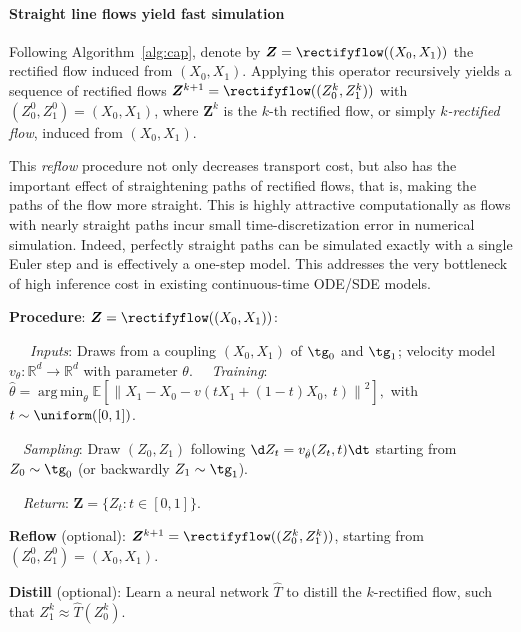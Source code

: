 \documentclass[11pt]{article}
\newcommand{\E}{\mathbb{E}}
\newcommand{\vv}[1]{\boldsymbol{#1}}
\DeclareMathOperator*{\argmin}{arg\,min}
\newcommand{\RR}{\mathbb{R}}
\newcommand{\norm}[1]{\left\|#1\right\|}
\begin{document}
 



\paragraph{Straight line flows yield fast simulation}
Following Algorithm~\ref{alg:cap}, 
denote by $\vv Z = \rectifyflow((X_0,X_1))$ the rectified flow induced from $(X_0,X_1)$. 
Applying this operator recursively 
yields a sequence of rectified  flows 
$\vv Z^{k+1} = \rectifyflow((Z_0^k, Z_1^k))$ with $(Z_0^0,Z_1^0)=(X_0,X_1)$, where $\vv Z^k$ is the $k$-th rectified flow, or simply \emph{$k$-rectified flow}, induced from $(X_0,X_1)$. 

This 
\emph{reflow} 
procedure %
not only decreases transport cost,
but also has the important effect of 
straightening paths of rectified flows, 
that is, making the paths of the flow more straight. 
This is highly attractive computationally  
as flows with nearly straight paths 
incur small time-discretization error 
in numerical simulation. Indeed, perfectly straight paths can be simulated exactly with a single Euler step and is effectively a one-step model. 
This addresses the very bottleneck of high inference cost 
in existing continuous-time ODE/SDE models.  














\begin{algorithm}[t]
\caption{{\Name} Flow: Main Algorithm}\label{alg:cap}
\begin{algorithmic}
\STATE \textbf{Procedure}: $\vv Z={\rectifyflow((X_0,X_1))}$: 
\vspace{.2\baselineskip}


\STATE~~~\emph{Inputs}: Draws from a coupling $(X_0,X_1)$ of $\tg_0$ and $\tg_1$; velocity model $v_\theta \colon \RR^d \to \RR^d$ with parameter $\theta.$ 
\vspace{.155\baselineskip}
\STATE~~\emph{Training}:
$
\displaystyle 
\hat \theta = \argmin_\theta
\E\left [\norm{X_1 - X_0 - v(t X_1 +(1-t)X_0, ~t )}^2 \right], 
$
with $t \sim \uniform([0,1])$.
\vspace{.15\baselineskip}


\STATE~~\emph{Sampling}: Draw $(Z_0,Z_1)$ following $\d Z_t = v_{\hat\theta}(Z_t,t)\dt$ starting from $Z_0 \sim \tg_0$ (or backwardly $Z_1\sim \tg_1$).


\STATE~~\emph{Return}: $\vv Z = \{Z_t\colon t\in[0,1]\}$.
\vspace{.4\baselineskip}


\STATE \textbf{Reflow} (optional): $%
\vv Z^{k+1} = \rectifyflow((Z_0^k, Z_1^k))$, starting from $(Z^0_0,Z^0_1) = (X_0,X_1)$.
\vspace{.2\baselineskip}

\STATE \textbf{Distill} (optional): Learn a neural network $\hat T$ to distill the $k$-rectified flow, such that $Z^k_1 \approx \hat T(Z^k_0)$. 
\end{algorithmic}
\end{algorithm}
\end{document}
